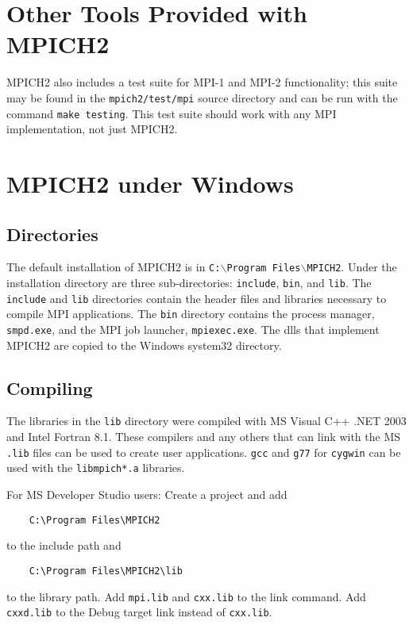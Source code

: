 \documentclass[dvipdfm,11pt]{article}
\begin{document}
\section{Other Tools Provided with MPICH2}
\label{sec:other-tools}
MPICH2 also includes a test suite for MPI-1 and MPI-2 functionality; this
suite may be found in the \texttt{mpich2/test/mpi} source directory and can be
run with the command \texttt{make testing}.  This test suite should work with
any MPI implementation, not just MPICH2.

\section{MPICH2 under Windows}
\label{sec:windows}

\subsection{Directories}
\label{sec:windir}

The default installation of MPICH2 is in
\texttt{C:$\backslash$Program Files$\backslash$MPICH2}. Under the installation
directory are three sub-directories: \texttt{include}, \texttt{bin}, and
\texttt{lib}.  The \texttt{include} and \texttt{lib} directories contain
the header files and libraries necessary to compile MPI applications.  
The \texttt{bin} directory contains the process manager, \texttt{smpd.exe},
and the MPI job launcher, \texttt{mpiexec.exe}.  The dlls that implement
MPICH2 are copied to the Windows system32 directory.

\subsection{Compiling}
\label{sec:wincompile}

The libraries in the \texttt{lib} directory were compiled with MS Visual C++ .NET 2003
and Intel Fortran 8.1.  These 
compilers and any others that can link with the MS \texttt{.lib} files can be used to
create user applications.  \texttt{gcc} and \texttt{g77} for \texttt{cygwin} can be used with the 
\texttt{libmpich*.a} libraries.

For MS Developer Studio users: Create a project and add
\begin{verbatim}
    C:\Program Files\MPICH2
\end{verbatim}
to the include path and
\begin{verbatim}
    C:\Program Files\MPICH2\lib
\end{verbatim}
to
the library path.  Add \texttt{mpi.lib} and \texttt{cxx.lib} to the
link command.  Add \texttt{cxxd.lib} to the Debug target link instead of
\texttt{cxx.lib}.
\end{document}
